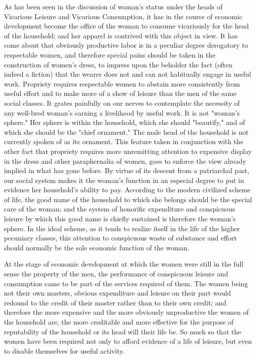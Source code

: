 \documentclass[12pt]{report}
\begin{document}
As has been seen in the discussion of woman's status under the heads
of Vicarious Leisure and Vicarious Consumption, it has in the course
of economic development become the office of the woman to consume
vicariously for the head of the household; and her apparel is contrived
with this object in view. It has come about that obviously productive
labor is in a peculiar degree derogatory to respectable women, and
therefore special pains should be taken in the construction of women's
dress, to impress upon the beholder the fact (often indeed a fiction)
that the wearer does not and can not habitually engage in useful work.
Propriety requires respectable women to abstain more consistently from
useful effort and to make more of a show of leisure than the men of the
same social classes. It grates painfully on our nerves to contemplate
the necessity of any well-bred woman's earning a livelihood by useful
work. It is not "woman's sphere." Her sphere is within the household,
which she should "beautify," and of which she should be the "chief
ornament." The male head of the household is not currently spoken of as
its ornament. This feature taken in conjunction with the other fact that
propriety requires more unremitting attention to expensive display in
the dress and other paraphernalia of women, goes to enforce the view
already implied in what has gone before. By virtue of its descent from a
patriarchal past, our social system makes it the woman's function in
an especial degree to put in evidence her household's ability to pay.
According to the modern civilized scheme of life, the good name of the
household to which she belongs should be the special care of the woman;
and the system of honorific expenditure and conspicuous leisure by which
this good name is chiefly sustained is therefore the woman's sphere.
In the ideal scheme, as it tends to realize itself in the life of
the higher pecuniary classes, this attention to conspicuous waste of
substance and effort should normally be the sole economic function of
the woman.

At the stage of economic development at which the women were still in
the full sense the property of the men, the performance of conspicuous
leisure and consumption came to be part of the services required of
them. The women being not their own masters, obvious expenditure and
leisure on their part would redound to the credit of their master rather
than to their own credit; and therefore the more expensive and the
more obviously unproductive the women of the household are, the more
creditable and more effective for the purpose of reputability of the
household or its head will their life be. So much so that the women have
been required not only to afford evidence of a life of leisure, but even
to disable themselves for useful activity.
\end{document}
